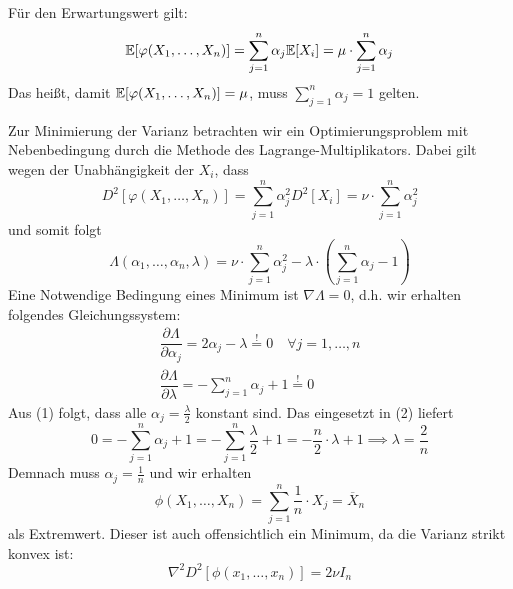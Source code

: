 \begin{loesung}
    Für den Erwartungswert gilt:
    \[
        \mathbb E[\varphi(X_1,\dots,X_n)] = \sum_{j=1}^{n} \alpha_j \mathbb E[X_i] = \mu\cdot\sum_{j=1}^{n}\alpha_j
    \]
    Das heißt, damit $\mathbb E[\varphi(X_1,\dots,X_n)]=\mu$, muss $\sum_{j=1}^{n}\alpha_j=1$ gelten. 

    Zur Minimierung der Varianz betrachten wir ein Optimierungsproblem mit Nebenbedingung durch 
    die Methode des Lagrange-Multiplikators. Dabei gilt wegen der Unabhängigkeit der $X_i$, dass 
    \[
        D^2[\varphi(X_1,\dots,X_n)] = \sum_{j=1}^{n}\alpha_j^2 D^2[X_i] = \nu\cdot\sum_{j=1}^{n}\alpha_j^2
    \]
    und somit folgt
    \[
        \Lambda(\alpha_1,\dots,\alpha_n, \lambda) 
        = \nu\cdot\sum_{j=1}^{n}\alpha_j^2 - \lambda\cdot\left(\sum_{j=1}^{n}\alpha_j-1\right)
    \]
    Eine Notwendige Bedingung eines Minimum ist $\nabla \Lambda = 0$, d.h. wir erhalten folgendes Gleichungssystem:
    \begin{align*}
        \dfrac{\partial \Lambda}{\partial \alpha_j}
        = 2\alpha_j - \lambda \stackrel{!}{=} 0 \quad\forall j=1,\dots,n\tag{1}\\
         \dfrac{\partial \Lambda}{\partial \lambda} = -\sum_{j=1}^{n}\alpha_j + 1 \stackrel{!}{=} 0\tag{2}
    \end{align*}
    Aus (1) folgt, dass alle $\alpha_j=\tfrac{\lambda}{2}$ konstant sind. Das eingesetzt in (2) liefert 
    \[
        0 = -\sum_{j=1}^{n}\alpha_j + 1 = -\sum_{j=1}^{n}\dfrac{\lambda}{2} + 1 = -\dfrac{n}{2}\cdot\lambda + 1
        \implies \lambda = \dfrac{2}{n}
    \]
    Demnach muss $\alpha_j=\tfrac{1}{n}$ und wir erhalten 
    \[
        \phi(X_1,\dots,X_n) = \sum_{j=1}^{n} \dfrac{1}{n}\cdot X_j = \overline{X}_n
    \]
    als Extremwert. Dieser ist auch offensichtlich ein Minimum, da die Varianz strikt konvex ist:
    \[
        \nabla^2 D^2[\phi(x_1,\dots,x_n)] = 2\nu I_n
    \]
\end{loesung}

